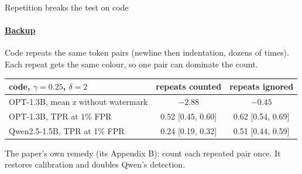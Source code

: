 \documentclass[aspectratio=169,10pt,t]{beamer}
\begin{document}
\begin{frame}[label=b14]{Repetition breaks the test on code}
  \framesubtitle{\hyperlink{b0}{Backup}}
  Code repeats the same token pairs (newline then indentation, dozens of times). Each repeat gets the same colour, so one pair can dominate the count.
  \vspace{0.6em}

  \begin{center}
  \begin{tabular}{@{}lcc@{}}
    \toprule
    code, $\gamma = 0.25$, $\delta = 2$ & repeats counted & repeats ignored \\
    \midrule
    OPT-1.3B, mean z without watermark & $-2.88$ & $-0.45$ \\
    OPT-1.3B, TPR at 1\% FPR & 0.52 [0.45, 0.60] & 0.62 [0.54, 0.69] \\
    Qwen2.5-1.5B, TPR at 1\% FPR & 0.24 [0.19, 0.32] & 0.51 [0.44, 0.59] \\
    \bottomrule
  \end{tabular}
  \end{center}
  \vspace{0.4em}
  \begin{goodbox}
    The paper's own remedy (its Appendix B): count each repeated pair once. It restores calibration and doubles Qwen's detection.
  \end{goodbox}
\end{frame}
\end{document}
